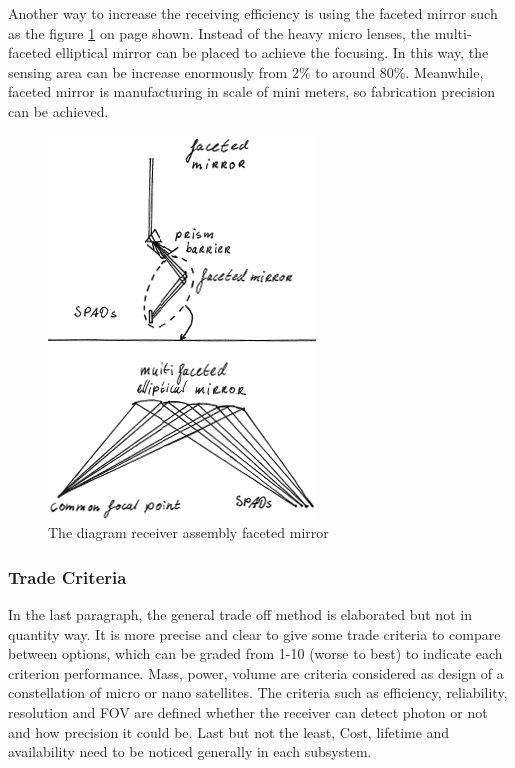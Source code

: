 Another way to increase the receiving efficiency is using the faceted mirror such as the figure \ref{fig:diagram_Rfaceted mirror} on page \pageref{fig:diagram_Rfaceted mirror} shown. Instead of the heavy micro lenses, the multi-faceted elliptical mirror can be placed to achieve the focusing. In this way, the sensing area can be increase enormously from 2\% to around 80\%. Meanwhile, faceted mirror is manufacturing in scale of mini meters, so fabrication precision can be achieved.

\begin{figure}[ht!]
\centering
\includegraphics[scale = 0.6]{chapters/img/DiagramReceiverAssemblyFacetedMirror.png}
\caption{The diagram receiver assembly faceted mirror}
\label{fig:diagram_Rfaceted mirror}
\end{figure}

\subsubsection{Trade Criteria}
\label{TOReceiverC}
In the last paragraph, the general trade off method is elaborated but not in quantity way. It is more precise and clear to give some trade criteria to compare between options, which can be graded from 1-10 (worse to best) to indicate each criterion performance. Mass, power, volume are criteria considered as design of a constellation of micro or nano satellites. The criteria such as efficiency, reliability, resolution and \ac{FOV} are defined whether the receiver can detect photon or not and how precision it could be. Last but not the least, Cost, lifetime and availability need to be noticed generally in each subsystem.

